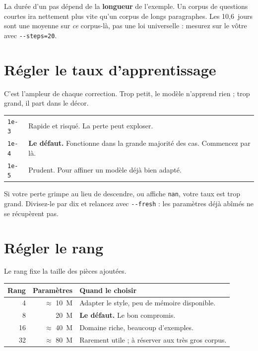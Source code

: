 \begin{nkpiege}
La durée d'un pas dépend de la \textbf{longueur} de l'exemple. Un corpus de
questions courtes ira nettement plus vite qu'un corpus de longs paragraphes. Les
10,6~jours sont une moyenne sur \emph{ce} corpus-là, pas une loi universelle :
mesurez sur le vôtre avec \texttt{-{}-steps=20}.
\end{nkpiege}

\section{Régler le taux d'apprentissage}

C'est l'ampleur de chaque correction. Trop petit, le modèle n'apprend rien ;
trop grand, il part dans le décor.

\begin{center}
\begin{tabular}{lp{9.4cm}}
\toprule
\texttt{1e-3} & Rapide et risqué. La perte peut exploser. \\
\texttt{1e-4} & \textbf{Le défaut.} Fonctionne dans la grande majorité des cas.
                Commencez par là. \\
\texttt{1e-5} & Prudent. Pour affiner un modèle déjà bien adapté. \\
\bottomrule
\end{tabular}
\end{center}

\begin{nkpiege}
Si votre perte grimpe au lieu de descendre, ou affiche \texttt{nan}, votre taux
est trop grand. Divisez-le par dix et relancez avec \texttt{-{}-fresh} : les
paramètres déjà abîmés ne se récupèrent pas.
\end{nkpiege}

\section{Régler le rang}

Le rang fixe la taille des pièces ajoutées.

\begin{center}
\begin{tabular}{rrp{7.4cm}}
\toprule
\textbf{Rang} & \textbf{Paramètres} & \textbf{Quand le choisir} \\
\midrule
4  & $\approx$ 10~M & Adapter le style, peu de mémoire disponible. \\
8  & 20~M & \textbf{Le défaut.} Le bon compromis. \\
16 & $\approx$ 40~M & Domaine riche, beaucoup d'exemples. \\
32 & $\approx$ 80~M & Rarement utile ; à réserver aux très gros corpus. \\
\bottomrule
\end{tabular}
\end{center}

